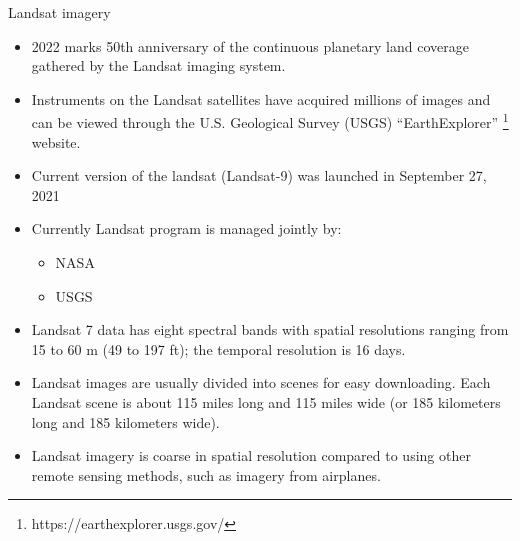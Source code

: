\documentclass[10pt,dvipsnames,ignorenonframetext,aspectratio=169]{beamer}
\providecommand{\tightlist}{%
  \setlength{\itemsep}{0pt}\setlength{\parskip}{0pt}}
\begin{document}
\begin{frame}{Landsat imagery}
\protect\hypertarget{landsat-imagery}{}
\begin{itemize}
\tightlist
\item
  2022 marks 50th anniversary of the continuous planetary land coverage
  gathered by the Landsat imaging system.
\item
  Instruments on the Landsat satellites have acquired millions of images
  and can be viewed through the U.S. Geological Survey (USGS)
  ``EarthExplorer'' \footnote[frame]{https://earthexplorer.usgs.gov/}
  website.
\item
  Current version of the landsat (Landsat-9) was launched in September
  27, 2021
\item
  Currently Landsat program is managed jointly by:

  \begin{itemize}
  \tightlist
  \item
    NASA
  \item
    USGS
  \end{itemize}
\item
  Landsat 7 data has eight spectral bands with spatial resolutions
  ranging from 15 to 60 m (49 to 197 ft); the temporal resolution is 16
  days.
\item
  Landsat images are usually divided into scenes for easy downloading.
  Each Landsat scene is about 115 miles long and 115 miles wide (or 185
  kilometers long and 185 kilometers wide).
\item
  Landsat imagery is coarse in spatial resolution compared to using
  other remote sensing methods, such as imagery from airplanes.
\end{itemize}
\end{frame}
\end{document}
